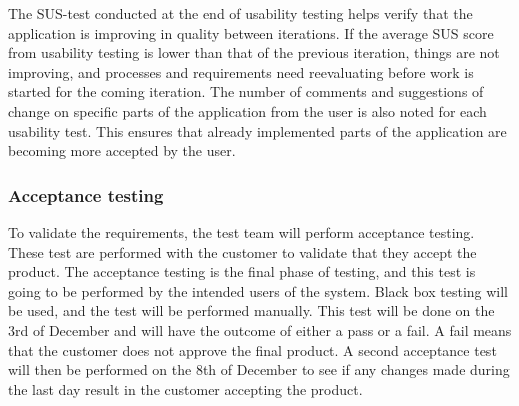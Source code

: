 \noindent The SUS-test conducted at the end of usability testing helps verify that the application is improving in quality between iterations. If the average SUS score from usability testing is lower than that of the previous iteration, things are not improving, and processes and requirements need reevaluating before work is started for the coming iteration. The number of comments and suggestions of change on specific parts of the application from the user is also noted for each usability test. This ensures that already implemented parts of the application are becoming more accepted by the user.\\

\subsubsection{Acceptance testing}
To validate the requirements, the test team will perform acceptance testing. These test are performed with the customer to validate that they accept the product. The acceptance testing is the final phase of testing, and this test is going to be performed by the intended users of the system. Black box testing will be used, and the test will be performed manually. This test will be done on the 3rd of December and will have the outcome of either a pass or a fail. A fail means that the customer does not approve the final product. A second acceptance test will then be performed on the 8th of December to see if any changes made during the last day result in the customer accepting the product. \newline

